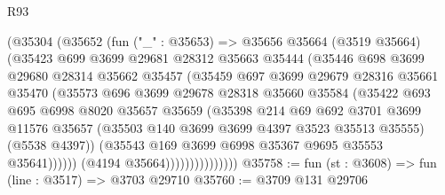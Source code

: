 \begin{lexlean}{R93}
\begin{coremodule}
                          (@35304
                            (@35652
                              (fun ("_" : @35653) =>
                              @35656
                                @35664
                                (@3519 @35664)
                                (@35423
                                  @699
                                  @3699
                                  @29681
                                  @28312
                                  @35663
                                  @35444
                                  (@35446
                                    @698
                                    @3699
                                    @29680
                                    @28314
                                    @35662
                                    @35457
                                    (@35459
                                      @697
                                      @3699
                                      @29679
                                      @28316
                                      @35661
                                      @35470
                                      (@35573
                                        @696
                                        @3699
                                        @29678
                                        @28318
                                        @35660
                                        @35584
                                        (@35422
                                          @693
                                          @695
                                          @6998
                                          @8020
                                          @35657
                                          @35659
                                          (@35398
                                            @214
                                            @69
                                            @692
                                            @3701
                                            @3699
                                            @11576
                                            @35657
                                            (@35503 @140 @3699 @3699 @4397 @3523 @35513 @35555)
                                            (@5538 @4397))
                                          (@35543 @169 @3699 @6998 @35367 @9695 @35553 @35641))))))
                                (@4194 @35664)))))))))))))))
@35758 := fun (st : @3608) => fun (line : @3517) => @3703 @29710
@35760 := @3709 @131 @29706

\end{coremodule}
\end{lexlean}
